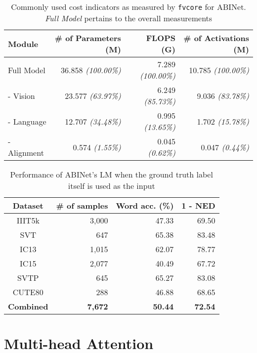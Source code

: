 \begin{table}[htbp]
    \setlength{\tabcolsep}{6pt}
    \centering
    \fontsize{8}{9.6}\selectfont
    \caption{Commonly used cost indicators as measured by \texttt{fvcore} for ABINet. \textit{Full Model} pertains to the overall measurements}
    \label{tab:external-lm}
    \begin{tabular}{l|r r r}
        \toprule
        \textbf{Module} & \# of Parameters (M) & FLOPS (G) & \# of Activations (M) \\
        \midrule
        Full Model & 36.858 \textit{(100.00\%)} & 7.289 \textit{(100.00\%)} & 10.785 \textit{(100.00\%)} \\
        \midrule
        - Vision & 23.577 \textit{(63.97\%)} & 6.249 \textit{(85.73\%)} & 9.036 \textit{(83.78\%)} \\
        - Language & 12.707 \textit{(34.48\%)} & 0.995 \textit{(13.65\%)} & 1.702 \textit{(15.78\%)} \\
        - Alignment & 0.574 \textit{(1.55\%)} & 0.045 \textit{(0.62\%)} & 0.047 \textit{(0.44\%)} \\
        \bottomrule
    \end{tabular}
\end{table}

\begin{table}[htbp]
    \centering
    \fontsize{8}{9.6}\selectfont
    \caption{Performance of ABINet's LM when the ground truth label itself is used as the input}
    \begin{tabular}{c|r|r|r}
        \toprule
        Dataset & \# of samples & Word acc. (\%) & 1 - NED \\
        \midrule
        IIIT5k & 3,000 & 47.33 & 69.50 \\
        SVT & 647 & 65.38 & 83.48 \\
        IC13 & 1,015 & 62.07 & 78.77 \\
        IC15 & 2,077 & 40.49 & 67.72 \\
        SVTP & 645 & 65.27 & 83.08 \\
        CUTE80 & 288 & 46.88 & 68.65 \\
        \midrule
        \textbf{Combined} & \textbf{7,672} & \textbf{50.44} & \textbf{72.54} \\
        \bottomrule
    \end{tabular}
    \label{tab:abinet-lm-acc}
\end{table}


\section{Multi-head Attention}

